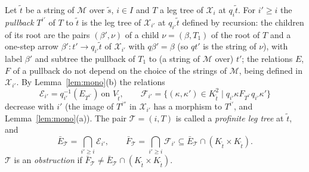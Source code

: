 \documentclass[11pt]{amsart}
\theoremstyle{definition}
\newcommand{\cX}{\mathcal X}
\newcommand{\cM}{\mathcal M}
\begin{document}
Let $\tilde t$ be a string of $\cM$ over $\tilde s$, $i\in I$ and $T$
a leg tree of $\cX_i$ at $q_i\tilde t$. For $i'\ge i$ the \emph{pullback}
$T^{i'}$ of $T$ to $\tilde t$ is the leg tree of $\cX_{i'}$ at $q_{i'}
\tilde t$ defined by recursion: the children of its root are the pairs
$(\beta',\nu)$ of a child $\nu=(\beta,T_1)$ of the root of $T$ and a
one-step arrow $\beta'\colon t'\to q_{i'}\tilde t$ of $\cX_{i'}$ with
$q\beta'=\beta$ (so $qt'$ is the string of $\nu$), with label $\beta'$
and subtree the pullback of $T_1$ to (a string of $\cM$ over) $t'$;
the relations $E$, $F$ of a pullback do not depend on the choice of
the strings of $\cM$, being defined in $\cX_{i'}$. By
Lemma~\ref{lem:mono}(b) the relations
\[
\mathcal E_{i'}=q_{i'}^{-1}(E_{T^{i'}})\ \text{on }V_{\tilde t},\qquad
\mathcal F_{i'}=\{(\kappa,\kappa')\in K_{\tilde t}^2\mid q_{i'}\kappa
\mathrel{F_{T^{i'}}}q_{i'}\kappa'\}
\]
decrease with $i'$ (the image of $T^{i''}$ in $\cX_{i'}$ has a
morphism to $T^{i'}$, and Lemma~\ref{lem:mono}(a)). The pair
$\mathcal T=(i,T)$ is called a \emph{profinite leg tree} at $\tilde
t$, and
\[
\bar E_{\mathcal T}=\bigcap_{i'\ge i}\mathcal E_{i'},\qquad
\bar F_{\mathcal T}=\bigcap_{i'\ge i}\mathcal F_{i'}\subseteq\bar
E_{\mathcal T}\cap(K_{\tilde t}\times K_{\tilde t}).
\]
$\mathcal T$ is an \emph{obstruction} if $\bar F_{\mathcal T}\ne\bar
E_{\mathcal T}\cap(K_{\tilde t}\times K_{\tilde t})$.
\end{document}
